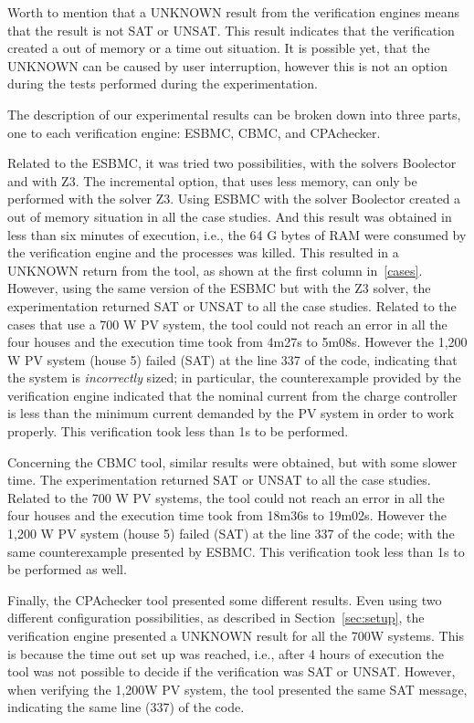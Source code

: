 \documentclass[review]{elsarticle}
\begin{document}
Worth to mention that a UNKNOWN result from the verification engines means that the result is not SAT or UNSAT. This result indicates that the verification created a out of memory or a time out situation. It is possible yet, that the UNKNOWN can be caused by user interruption, however this is not an option during the tests performed during the experimentation.

The description of our experimental results can be broken down into three parts, one to each verification engine: ESBMC, CBMC, and CPAchecker.

Related to the ESBMC, it was tried two possibilities, with the solvers Boolector and with Z3. The incremental option, that uses less memory, can only be performed with the solver Z3. Using ESBMC with the solver Boolector created a out of memory situation in all the case studies. And this result was obtained in less than six minutes of execution, i.e., the 64 G bytes of RAM were consumed by the verification engine and the processes was killed. This resulted in a UNKNOWN return from the tool, as shown at the first column in~\ref{cases}. However, using the same version of the ESBMC but with the Z3 solver, the experimentation returned SAT or UNSAT to all the case studies. Related to the cases that use a 700 W PV system, the tool could not reach an error in all the four houses and the execution time took from 4m27s to 5m08s. However the 1,200 W PV system (house 5) failed (SAT) at the line 337 of the code, indicating that the system is \textit{incorrectly} sized; in particular, the counterexample provided by the verification engine indicated that the nominal current from the charge controller is less than the minimum current demanded by the PV system in order to work properly. This verification took less than 1s to be performed. 

Concerning the CBMC tool, similar results were obtained, but with some slower time. The experimentation returned SAT or UNSAT to all the case studies. Related to the 700 W PV systems, the tool could not reach an error in all the four houses and the execution time took from 18m36s to 19m02s. However the 1,200 W PV system (house 5) failed (SAT) at the line 337 of the code; with the same counterexample presented by ESBMC. This verification took less than 1s to be performed as well. 

Finally, the CPAchecker tool presented some different results. Even using two different configuration possibilities, as described in Section~\ref{sec:setup}, the verification engine presented a UNKNOWN result for all the 700W systems. This is because the time out set up was reached, i.e., after 4 hours of execution the tool was not possible to decide if the verification was SAT or UNSAT. However, when verifying the 1,200W PV system, the tool presented the same SAT message, indicating the same line (337) of the code. 
\end{document}
